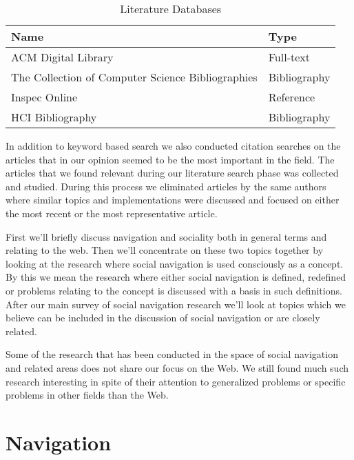 \begin{table}
  \centering
  \caption{Literature Databases}
  \label{table:literature.databases}

  \begin{tabular}{p{20pc}l}

    \toprule
    Name & Type \\
    \midrule

    ACM Digital Library &
    Full-text \\

    The Collection of Computer Science Bibliographies &
    Bibliography \\

    Inspec Online &
    Reference \\

    HCI Bibliography &
    Bibliography \\

  \end{tabular}
\end{table}

In addition to keyword based search we also conducted citation searches on the
articles that in our opinion seemed to be the most important in the field.
The articles that we found relevant during our literature search phase was
collected and studied. During this process we eliminated articles by the same
authors where similar topics and implementations were discussed and focused on
either the most recent or the most representative article.

First we'll briefly discuss navigation and sociality both in general terms
and relating to the web. Then we'll concentrate on these two topics together
by looking at the research where social navigation is used
consciously as a concept. By this we mean the research where either social
navigation is defined, redefined or problems relating to the concept is
discussed with a basis in such definitions.
After our main survey of social navigation research we'll look at topics
which we believe can be included in the discussion of social navigation or are
closely related.

Some of the research that has been conducted in the space of
social navigation and related areas does not share our focus on the Web.
We still found much such research interesting in spite of their attention to
generalized problems or specific problems in other fields than the Web.

\section{Navigation}

